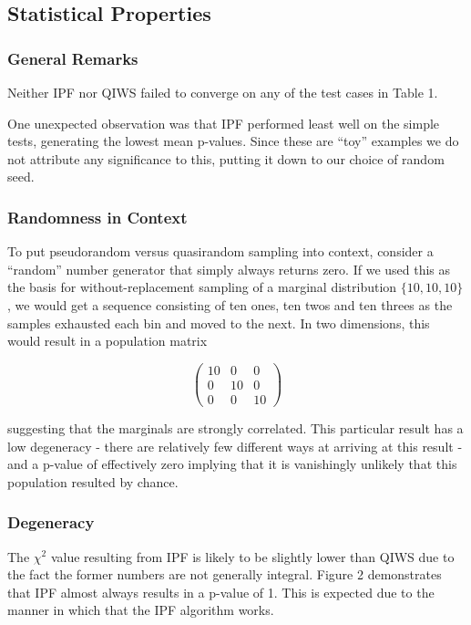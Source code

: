 \documentclass[]{article}
\begin{document}
\subsection{Statistical Properties}\label{statistical-properties-1}

\subsubsection{General Remarks}\label{general-remarks}

Neither IPF nor QIWS failed to converge on any of the test cases in
Table 1.

One unexpected observation was that IPF performed least well on the
simple tests, generating the lowest mean p-values. Since these are
``toy'' examples we do not attribute any significance to this, putting
it down to our choice of random seed.

\subsubsection{Randomness in Context}\label{randomness-in-context}

To put pseudorandom versus quasirandom sampling into context, consider a
``random'' number generator that simply always returns zero. If we used
this as the basis for without-replacement sampling of a marginal
distribution \(\lbrace10,10,10\rbrace\), we would get a sequence
consisting of ten ones, ten twos and ten threes as the samples exhausted
each bin and moved to the next. In two dimensions, this would result in
a population matrix

\[\left( \begin{array}{ccc}
10 & 0 & 0 \\
0 & 10 & 0 \\
0 & 0 & 10 \end{array} \right)\]

suggesting that the marginals are strongly correlated. This particular
result has a low degeneracy - there are relatively few different ways at
arriving at this result - and a p-value of effectively zero implying
that it is vanishingly unlikely that this population resulted by chance.

\subsubsection{Degeneracy}\label{degeneracy}

The \(\chi^2\) value resulting from IPF is likely to be slightly lower
than QIWS due to the fact the former numbers are not generally integral.
Figure 2 demonstrates that IPF almost always results in a p-value of 1.
This is expected due to the manner in which that the IPF algorithm
works.
\end{document}
